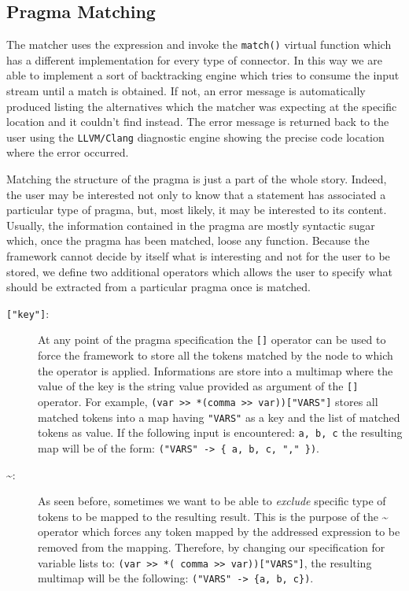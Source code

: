 \documentclass[10pt]{report}
\begin{document}
\subsection{Pragma Matching}

The matcher uses the expression and invoke the {\tt match()} virtual function
which has a different implementation for every type of connector. In this way we
are able to implement a sort of backtracking engine which tries to consume the
input stream until a match is obtained. If not, an error message is
automatically produced listing the alternatives which the matcher was expecting
at the specific location and it couldn't find instead. The error message is
returned back to the user using the {\tt LLVM/Clang} diagnostic engine showing
the precise code location where the error occurred. 

Matching the structure of the pragma is just a part of the whole story. Indeed,
the user may be interested not only to know that a statement has associated a
particular type of pragma, but, most likely, it may be interested to its
content.  Usually, the information contained in the pragma are mostly syntactic
sugar which, once the pragma has been matched, loose any function. Because the
framework cannot decide by itself what is interesting and not for the user to be
stored, we define two additional operators which allows the user to specify what
should be extracted from a particular pragma once is matched. 

\begin{description}
\item [{\tt["key"]}:] At any point of the pragma specification the {\tt []}
operator can be used to force the framework to store all the tokens matched by
the node to which the operator is applied. Informations are store into a
multimap where the value of the key is the string value provided as argument of
the {\tt []} operator. 
For example, {\tt (var >> *(comma >> var))["VARS"]} stores all matched
tokens into a map having {\tt "VARS"} as a key and the list of matched tokens as
value. If the following input is encountered: {\tt a, b, c} the resulting
map will be of the form: {\tt ("VARS" -> \{ a, b, c, "," \})}. 

\item [\~{}:] As seen before, sometimes we want to be able to {\em exclude}
specific type of tokens to be mapped to the resulting result. This is the
purpose of the \~{} operator which forces any token mapped by the addressed
expression to be removed from the mapping. Therefore, by changing our
specification for variable lists to: {\tt (var >> *(~comma >>
var))["VARS"]}, the resulting multimap will be the following:  {\tt ("VARS" ->
\{a, b, c\})}.

\end{description}
\end{document}
